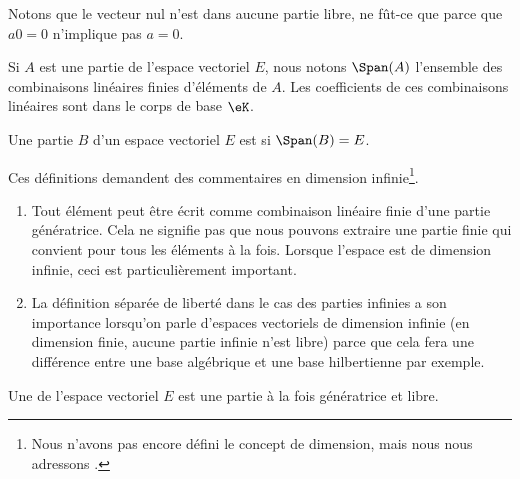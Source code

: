 \begin{remark}
	Notons que le vecteur nul n'est dans aucune partie libre, ne fût-ce que parce que \( a0=0\) n'implique pas \( a=0\).
\end{remark}

Si \( A\) est une partie de l'espace vectoriel \( E\), nous notons \( \Span(A)\) l'ensemble des combinaisons linéaires finies d'éléments de \( A\). Les coefficients de ces combinaisons linéaires sont dans le corps de base \( \eK\).

\begin{definition}
	Une partie \( B\) d'un espace vectoriel \( E\) est  si \( \Span(B)=E\).
\end{definition}

\begin{remark}
	Ces définitions demandent des commentaires en dimension infinie\footnote{Nous n'avons pas encore défini le concept de dimension, mais nous nous adressons .}.

	\begin{enumerate}
		\item
		      Tout élément peut être écrit comme combinaison linéaire finie d'une partie génératrice. Cela ne signifie pas que nous pouvons extraire une partie finie qui convient pour tous les éléments à la fois. Lorsque l'espace est de dimension infinie, ceci est particulièrement important.
		\item
		      La définition séparée de liberté dans le cas des parties infinies a son importance lorsqu'on parle d'espaces vectoriels de dimension infinie (en dimension finie, aucune partie infinie n'est libre) parce que cela fera une différence entre une base algébrique et une base hilbertienne par exemple.
	\end{enumerate}
\end{remark}

\begin{definition}[Base]        \label{DEFooNGDSooEDAwTh}
	Une  de l'espace vectoriel \( E\) est une partie à la fois génératrice et libre.
\end{definition}

